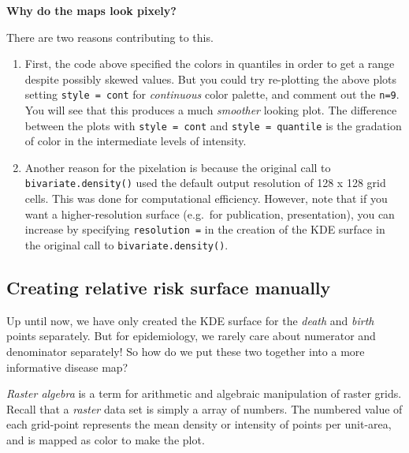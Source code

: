 \documentclass[
]{book}
\newenvironment{rmdtip}[1]
  {
  \begin{itemize}
  \renewcommand{\labelitemi}{
    \raisebox{-.7\height}[0pt][0pt]{
      {\setkeys{Gin}{width=3em,keepaspectratio}\texttt{[image: images/\#1]}}
    }
  }
  \setlength{\fboxsep}{1em}
  \begin{tip}
  \item
  }
  {
  \end{tip}
  \end{itemize}
  }
\begin{document}
\begin{rmdtip}{tip}

\textbf{Why do the maps look pixely?}

There are two reasons contributing to this.

\begin{enumerate}
\def\labelenumi{\arabic{enumi}.}
\item
  First, the code above specified the colors in quantiles in order to get a range despite possibly skewed values. But you could try re-plotting the above plots setting \texttt{style\ =\ \textquotesingle{}cont\textquotesingle{}} for \emph{continuous} color palette, and comment out the \texttt{n=9}. You will see that this produces a much \emph{smoother} looking plot. The difference between the plots with \texttt{style\ =\ \textquotesingle{}cont\textquotesingle{}} and \texttt{style\ =\ \textquotesingle{}quantile\textquotesingle{}} is the gradation of color in the intermediate levels of intensity.
\item
  Another reason for the pixelation is because the original call to \texttt{bivariate.density()} used the default output resolution of 128 x 128 grid cells. This was done for computational efficiency. However, note that if you want a higher-resolution surface (e.g.~for publication, presentation), you can increase by specifying \texttt{resolution\ =} in the creation of the KDE surface in the original call to \texttt{bivariate.density()}.
\end{enumerate}

\end{rmdtip}

\hypertarget{creating-relative-risk-surface-manually}{%
\subsection{Creating relative risk surface manually}\label{creating-relative-risk-surface-manually}}

Up until now, we have only created the KDE surface for the \emph{death} and \emph{birth} points separately. But for epidemiology, we rarely care about numerator and denominator separately! So how do we put these two together into a more informative disease map?

\emph{Raster algebra} is a term for arithmetic and algebraic manipulation of raster grids. Recall that a \emph{raster} data set is simply a array of numbers. The numbered value of each grid-point represents the mean density or intensity of points per unit-area, and is mapped as color to make the plot.
\end{document}

